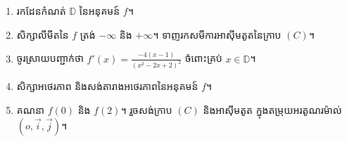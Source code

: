 \documentclass{officialexam}
\begin{document}
\begin{enumerate}[m]
	\begin{enumerate}[k]
		\item រកដែនកំណត់ $\mathbb{D}$ នៃអនុគមន៍ $f$។
		\item សិក្សាលីមីតនៃ $f$ ត្រង់ $-\infty$ និង $+\infty$។ ទាញរកសមីការអាសុីមតូតនៃក្រាប $\left(C\right)$។
		\item ចូរស្រាយបញ្ជាក់ថា $f'(x)=\frac{-4\left(x-1\right)}{\left(x^2-2x+2\right)^{2}}$ ចំពោះគ្រប់ $x\in\mathbb{D}$។
		\item សិក្សាអថេរភាព និងសង់តារាងអថេរភាពនៃអនុគមន៍ $f$។
		\item គណនា $f(0)$ និង $f(2)$។ រួចសង់ក្រាប $\left(C\right)$ និងអាសុីមតូត ក្នុងតម្រុយអរតូណរម៉ាល់ $\left(o,\vec{i},\vec{j}\right)$។
	\end{enumerate}
\end{enumerate}
\end{document}
